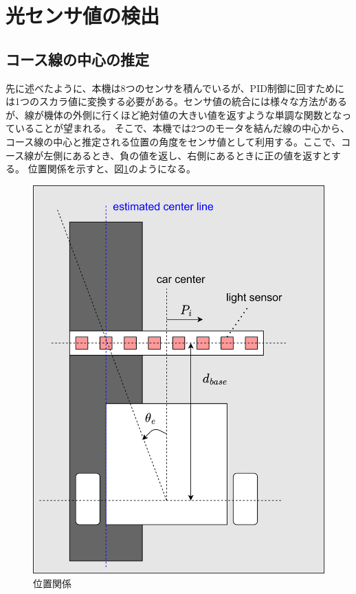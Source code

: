 \documentclass{ltjsreport}
\begin{document}

\section{光センサ値の検出}
\subsection{コース線の中心の推定}
先に述べたように、本機は8つのセンサを積んでいるが、PID制御に回すためには1つのスカラ値に変換する必要がある。センサ値の統合には様々な方法があるが、線が機体の外側に行くほど絶対値の大きい値を返すような単調な関数となっていることが望まれる。
そこで、本機では2つのモータを結んだ線の中心から、コース線の中心と推定される位置の角度をセンサ値として利用する。ここで、コース線が左側にあるとき、負の値を返し、右側にあるときに正の値を返すとする。
位置関係を示すと、図\ref{fig:linepos}のようになる。
\begin{figure}[H]
  \centering
  \includegraphics[keepaspectratio, scale=0.05]
       {img/sensor_theta.drawio.png}
  \caption{位置関係}
  \label{fig:linepos}
 \end{figure}
\end{document}
